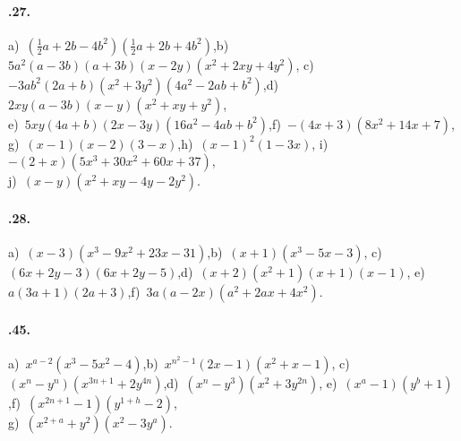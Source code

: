 \paragraph{\thechapter.27.} a)~$\left(\frac{1}{2}a+2b-4b^{2}\right)\left(\frac{1}{2}a+2b+4b^{2}\right)$,\quad b)~$5a^{2}(a-3b)(a+3b)(x-2y)(x^{2}+2xy+4y^{2})$,
c)~$-3{ab}^{2}(2a+b)(x^{2}+3y^{2})(4a^{2}-2{ab}+b^{2})$,\quad d)~$2xy(a-3b)(x-y)(x^{2}+xy+y^{2})$,\protect\\
e)~$5xy(4a+b)(2x-3y)(16a^{2}-4{ab}+b^{2})$,\quad f)~$-(4x+3)(8x^{2}+14x+7)$,\quad \protect\\
g)~$(x-1)(x-2)(3-x)$,\quad h)~$(x-1)^{2}(1-3x)$,\quad
i)~$-(2+x)(5x^{3}+30x^{2}+60x+37)$,\protect\\
j)~$(x-y)(x^{2}+xy-4y-2y^{2})$.

\paragraph{\thechapter.28.} a)~$(x-3)(x^{3}-9x^{2}+23x-31)$,\quad b)~$(x+1)(x^{3}-5x-3)$,\quad
c)~$(6x+2y-3)(6x+2y-5)$,\quad d)~$(x+2)\left(x^{2}+1\right)(x+1)(x-1)$,\quad
e)~$a(3a+1)(2a+3)$,\quad f)~$3a(a-2x)\left(a^{2}+2ax+4x^{2}\right)$.

\paragraph{\thechapter.45.} a)~$x^{a-2}(x^{3}-5x^{2}-4)$,\quad b)~$x^{n^{2}-1}(2x-1)(x^{2}+x-1)$,\quad
c)~$(x^{n}-y^{n})(x^{3n+1}+2y^{4n})$,\quad d)~$(x^{n}-y^{3})(x^{2}+3y^{2n})$,\quad
e)~$(x^{a}-1)(y^{b}+1)$,\quad f)~$(x^{2n+1}-1)(y^{1+h}-2)$,\protect\\
g)~$(x^{2+a}+y^{2})(x^{2}-3y^{a})$.

